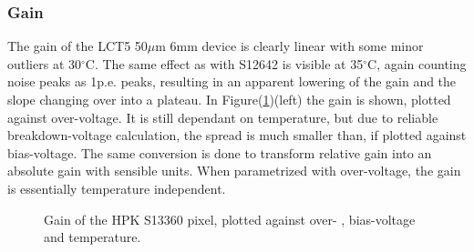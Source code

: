 \documentclass[12pt,article,type=msc,colorback,accentcolor=tud9c]{tudthesis}
\begin{document}
\subsubsection{Gain}


The gain of the LCT5 50$\mu$m 6mm device is clearly linear with some minor outliers at 30$^{\circ}$C.  The same effect as with S12642 is visible at 35$^{\circ}$C, again counting noise peaks as 1p.e. peaks, resulting in an apparent lowering of the gain and the slope changing over into a plateau. In Figure(\ref{fig:S13360_Gain})(left) the gain is shown, plotted against over-voltage. It is still dependant on temperature, but due to reliable breakdown-voltage calculation, the spread is much smaller than, if plotted against bias-voltage. The same conversion is done to transform relative gain into an absolute gain with sensible units. When parametrized with over-voltage, the gain is essentially temperature independent.
\begin{figure}[h]
\begin{centering}
\caption{Gain of the HPK S13360 pixel, plotted against over- , bias-voltage and temperature. }
\label{fig:S13360_Gain}
\end{centering}
\end{figure}
\end{document}
